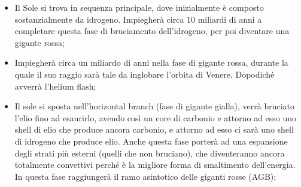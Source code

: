 \begin{itemize}
    \item Il Sole si trova in sequenza principale, dove inizialmente è composto sostanzialmente da idrogeno. Impiegherà circa 10 miliardi di anni a completare questa fase di bruciamento dell'idrogeno, per poi diventare una gigante rossa;
    \item Impiegherà circa un miliardo di anni nella fase di gigante rossa, durante la quale il suo raggio sarà tale da inglobare l'orbita di Venere. Dopodiché avverrà l'helium flash;
    \item Il sole si sposta nell'horizontal branch (fase di gigante gialla), verrà bruciato l'elio fino ad esaurirlo, avendo così un core di carbonio e attorno ad esso uno shell di elio che produce ancora carbonio, e attorno ad esso ci sarà uno shell di idrogeno che produce elio. Anche questa fase porterà ad una espansione degli strati più esterni (quelli che non bruciano), che diventeranno ancora totalmente convettivi perché è la migliore forma di smaltimento dell'energia. In questa fase raggiungerà il ramo asintotico delle giganti rosse (AGB);

\end{itemize}
